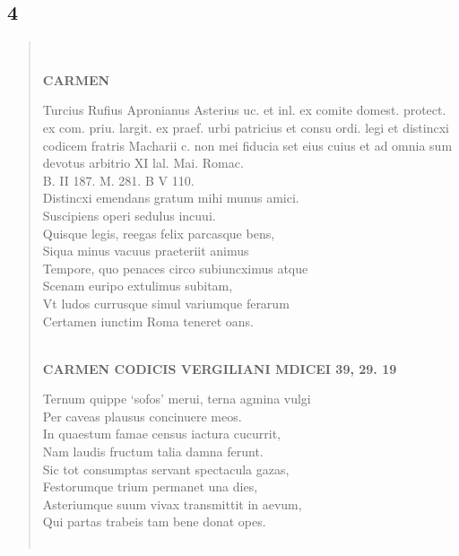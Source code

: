\documentclass[11pt, a4paper]{report}
\begin{document}
            \subsection*{4}
      \begin{verse}
      
        ﻿\pagebreak 
    \begin{center} \textbf{CARMEN} \end{center}
                    Turcius Rufius Apronianus Asterius uc. et inl. ex comite domest.
                    protect. ex com. priu. largit. ex praef. urbi patricius et consu ordi. legi
                    et distincxi codicem fratris Macharii c. non mei fiducia set eius cuius et
                    ad omnia sum devotus arbitrio XI lal. Mai. Romac.  \\ B. II 187. M. 281. B V 110. \\ Distincxi emendans gratum mihi munus amici. \\ Suscipiens operi sedulus incuui. \\ Quisque legis, reegas felix parcasque bens, \\ Siqua minus vacuus praeteriit animus \\ Tempore, quo penaces circo subiuncximus atque \\ Scenam euripo extulimus subitam, \\ Vt ludos currusque simul variumque ferarum \\ Certamen iunctim Roma teneret oans. \\ 
        ﻿\pagebreak 
    \begin{center} \textbf{CARMEN CODICIS VERGILIANI MDICEI 39, 29. 19} \end{center}Ternum quippe ‘sofos’ merui, terna agmina vulgi \\ Per caveas plausus concinuere meos. \\ In quaestum famae census iactura cucurrit, \\ Nam laudis fructum talia damna ferunt. \\ Sic tot consumptas servant spectacula gazas, \\ Festorumque trium permanet una dies, \\ Asteriumque suum vivax transmittit in aevum, \\ Qui partas trabeis tam bene donat opes. \\ 
        ﻿\pagebreak 

\end{verse}
\end{document}
